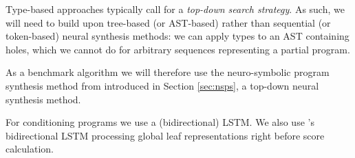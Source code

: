 \documentclass{article}
\begin{document}
Type-based approaches typically call for a \emph{top-down search strategy}.
As such, we will need to build upon tree-based (or AST-based) rather than sequential (or token-based) neural synthesis methods:
we can apply types to an AST containing holes,
which we cannot do for arbitrary sequences representing a partial program.

As a benchmark algorithm we will therefore use the neuro-symbolic program synthesis
method from \citet{nsps} introduced in Section \ref{sec:nsps},
a top-down neural synthesis method.








For conditioning programs we use a (bidirectional) LSTM.
We also use \citet{nsps}'s bidirectional LSTM processing global leaf representations right before score calculation.
\end{document}

